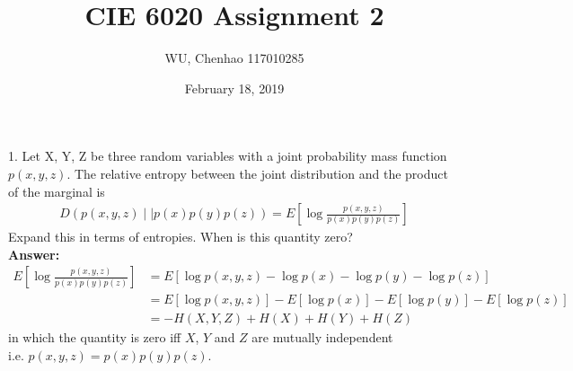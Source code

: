 \documentclass[12pt]{article}
\author{WU, Chenhao  117010285}
\title{CIE 6020 Assignment 2}
\date{February 18, 2019}
\begin{document}
	\maketitle
	\par
	1. Let X, Y, Z be three random variables with a joint probability mass function $p(x,y,z)$. The relative entropy between the joint distribution and the product of the marginal is 
	\begin{align*}
		D(p(x,y,z){\mid}{\mid}p(x)p(y)p(z)) = E[\log\frac{p(x,y,z)}{p(x)p(y)p(z)}]
	\end{align*}
	Expand this in terms of entropies. When is this quantity zero?\\
	\textbf{Answer:} 
	\begin{align*}
		E[\log\frac{p(x,y,z)}{p(x)p(y)p(z)}] &= E[\log p(x,y,z) - \log p(x) - \log p(y) - \log p(z)] \\
								             &= E[\log p(x,y,z)] - E[\log p(x)] - E[\log p(y)] - E[\log p(z)] \\
								             &= -H(X,Y,Z) + H(X) + H(Y) + H(Z)
	\end{align*}
	in which the quantity is zero iff $X$, $Y$ and $Z$ are mutually independent \\
	i.e. $p(x,y,z) = p(x)p(y)p(z)$.\\
	
\end{document}
